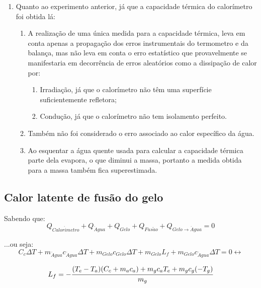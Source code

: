 \documentclass[a4paper]{article}
\begin{document}
\begin{enumerate}
\begin{enumerate}
						\item
					\end{enumerate}
					\item Quanto ao experimento anterior, já que a capacidade térmica do calorímetro foi obtida lá:
					\begin{enumerate}
						\item A realização de uma única medida para a capacidade térmica, leva em conta apenas a propagação dos erros instrumentais do termometro e da balança, mas não leva em conta o erro estatístico que provavelmente se manifestaria em decorrência de erros aleatórios como a dissipação de calor por:
						\begin{enumerate}
							\item Irradiação, já que o calorímetro não têm uma superfície suficientemente refletora;
							\item Condução, já que o calorímetro não tem isolamento perfeito.
						\end{enumerate}
						\item Também não foi considerado o erro associado ao calor específico da água.
						\item Ao esquentar a água quente usada para calcular a capacidade térmica parte dela evapora, o que diminui a massa, portanto a medida obtida para a massa também fica superestimada.

					\end{enumerate}
				\end{enumerate}

		\subsection{Calor latente de fusão do gelo}
			Sabendo que:
			\begin{equation}
				Q_{Calor\acute{i}metro} + Q_{\acute{A}gua} + Q_{Gelo} + Q_{Fus\tilde{a}o} + Q_{Gelo \rightarrow \acute{A}gua} = 0
			\end{equation}
			
			...ou seja:
			\hspace{-2cm}%
			$$ C_{c}\Delta T + m_{\acute{A}gua}c_{\acute{A}gua}\Delta T + m_{Gelo}c_{Gelo}\Delta T +  m_{Gelo}L_{f} + m_{Gelo}c_{\acute{A}gua}\Delta T = 0 \leftrightarrow$$
			
			\begin{equation}
			 	L_{f} = -\cfrac{(T_{e}-T_{a})(C_{c}+m_{a}c_{a}) + m_{g}c_{a}T_{e} + m_{g}c_{g}(-T_{g})}{m_g}
			\end{equation}
			  
\end{document}
